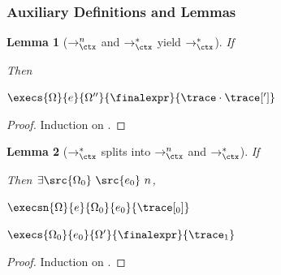 \documentclass[a4paper,names,dvipsnames]{article}
\newtheorem{lemma}{Lemma}
\begin{document}
\subsubsection{Auxiliary Definitions and Lemmas}\label{sec:mmla:aux}

\begin{lemma}[$\rightarrow^{n}_{\ctx}$ and $\rightarrow^{*}_{\ctx}$ yield $\rightarrow^{*}_{\ctx}$]\label{lem:execsn:yields:execs}
  If
  Then
  \begin{goals}
    \item $\execs{\Omega}{e}{\Omega''}{\finalexpr}{\trace\cdot\trace[']}$
  \end{goals}
\end{lemma}
\begin{proof}
  Induction on .
\end{proof}

\begin{lemma}[$\rightarrow^{*}_{\ctx}$ splits into $\rightarrow^{n}_{\ctx}$ and $\rightarrow^{*}_{\ctx}$]\label{lem:execs:splitsinto:execsn}
  If
  Then $\exists \src{\Omega_{0}}\ \src{e_{0}}\ n$,
  \begin{goals}
    \item $\execsn{\Omega}{e}{\Omega_{0}}{e_{0}}{\trace[_{0}]}$
    \item $\execs{\Omega_{0}}{e_{0}}{\Omega'}{\finalexpr}{\trace_{1}}$
  \end{goals}
\end{lemma}
\begin{proof}
  Induction on .
\end{proof}
\end{document}
